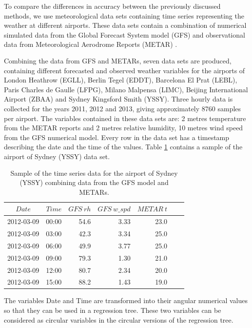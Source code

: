 \documentclass[times,twocolumn,final,authoryear]{elsarticle}
\begin{document}
To compare the differences in accuracy between the previously discussed methods, we use meteorological data sets containing time series representing the weather at different airports. These data sets contain a combination of numerical simulated data from the Global Forecast System model (GFS) \citep{CampanaCaplan2005} and observational data from Meteorological Aerodrome Reports (METAR) \citep{WMO1995}.

Combining the data from GFS and METARs, seven data sets are produced, containing different forecasted and observed weather variables for the airports of London Heathrow (EGLL), Berlin Tegel (EDDT), Barcelona El Prat (LEBL), Paris Charles de Gaulle (LFPG), Milano Malpensa (LIMC), Beijing International Airport (ZBAA) and Sydney Kingsford Smith (YSSY). Three hourly data is collected for the years 2011, 2012 and 2013, giving approximately 8760 samples per airport. The variables contained in these data sets are: 2 metres temperature from the METAR reports and 2 metres relative humidity, 10 metres wind speed from the GFS numerical model. Every row in the data set has a timestamp describing the date and the time of the values. Table \ref{t2} contains a sample of the airport of Sydney (YSSY) data set.

\begin{table}[t]
\caption{Sample of the time series data for the airport of Sydney (YSSY) combining data from the GFS model and METARs.}\label{t2}
\begin{center}
\begin{tabular}{crrrrrr}
\hline\hline
$Date$ & $Time$ & $GFS\ rh$ & $GFS\ w\_spd$ & $METAR\ t$\\
\hline
2012-03-09 & 00:00 & 54.6 & 3.33 & 23.0\\
2012-03-09 & 03:00 & 42.3 & 3.34 & 25.0\\
2012-03-09 & 06:00 & 49.9 & 3.77 & 25.0\\
2012-03-09 & 09:00 & 79.3 & 1.30 & 21.0\\
2012-03-09 & 12:00 & 80.7 & 2.34 & 20.0\\
2012-03-09 & 15:00 & 88.2 & 1.43 & 19.0\\
\hline
\end{tabular}
\end{center}
\end{table}

The variables Date and Time are transformed into their angular numerical values so that they can be used in a regression tree. These two variables can be considered as circular variables in the circular versions of the regression tree.
\end{document}
